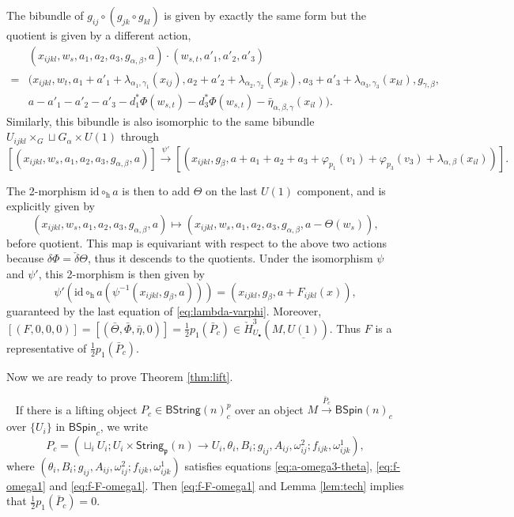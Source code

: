 \documentclass[letterpaper,10pt, oneside]{article} %
\newcommand{\bstringnp}{\mathsf{BString}(n)^p_{c}} %
\newcommand{\String}{\mathsf{String}}%
\newcommand{\BSpin}{\mathsf{BSpin}}%
\newcommand{\pf}{\noindent{\bf Proof.}\ }
\newcommand{\frkp}{\mathfrak p}
\def\qed{\hfill ~\vrule height6pt width6pt depth0pt}
\newcommand{\half}{\frac{1}{2}}
\newcommand{\pp}{\frkp} %
\newcommand{\h}{\mathrm{h}}
\newcommand{\id}{\mathrm{id}}
\newcommand{\bPhi}{\bar{\Phi}}
\newcommand{\bareta}{\bar{\eta}}
\newcommand{\bTheta}{\bar{\Theta}}
\begin{document}
The bibundle of $g_{ij} \circ (g_{jk}\circ
g_{kl})$ is given by exactly the same form but  the quotient is
given by a different action,
\[
\begin{split}
& (x_{ijkl}, w_s, a_1, a_2, a_3, g_{\alpha,\beta}, a) \cdot (w_{s, t},
a'_1, a'_2, a'_3)  \\
=& (x_{ijkl}, w_t, a_1+a'_1 + \lambda_{\alpha_1,\gamma_1}(x_{ij}),
a_2+a'_2+\lambda_{\alpha_2,\gamma_2}(x_{jk}),
a_3+a'_3+\lambda_{\alpha_3,\gamma_3}(x_{kl}), g_{\gamma,\beta}, \\
&a-a'_1-a'_2-a'_3-d_1^*\Phi(w_{s,t})-d^*_3\Phi(w_{s,t})-\bareta_{\alpha, \beta, \gamma}(x_{il})
).
\end{split}
\] Similarly,  this bibundle is also isomorphic to the same bibundle $U_{ijkl}\times_{G} \sqcup G_\alpha
\times U(1)$ through
\[
[(x_{ijkl}, w_s, a_1, a_2, a_3, g_{\alpha,\beta}, a)] \xrightarrow{\psi'}
[(x_{ijkl}, g_\beta,
a+a_1+a_2+a_3+\varphi_{p_1}(v_1)+\varphi_{p_3}(v_3)+\lambda_{\alpha,\beta}(x_{il}) )].
\]


The 2-morphism $\id\circ_\h a$ is then to add $\Theta$ on the last $U(1)$
component, and is
explicitly given by
\[
(x_{ijkl}, w_s, a_1, a_2, a_3, g_{\alpha,\beta}, a) \mapsto (x_{ijkl},
w_s, a_1, a_2, a_3, g_{\alpha,\beta}, a-\Theta(w_s) ),
\] before quotient. This map is
equivariant with respect to the above two actions because
$\delta\Phi=\check{\delta} \Theta$, thus it descends to
the quotients.  Under the isomorphism $\psi$ and $\psi'$, this
2-morphism is then given by
\[
\psi' (\id\circ_\h a (\psi^{-1}(x_{ijkl}, g_\beta, a)))=(x_{ijkl},
g_{\beta}, a+F_{ijkl}(x)),
\]
guaranteed by the last equation of \eqref{eq:lambda-varphi}. Moreover,
$[(F, 0, 0, 0)]=[ (\bTheta, \bPhi, \bareta, 0)] = \half p_1(\bar{P}_c)
\in \check{H}^3_{U_\bullet}(M, \underline{U(1)})$. Thus $F$ is a representative of $
\half p_1(\bar{P}_c)$.
\qed\vspace{3mm}

Now we are ready to prove Theorem \ref{thm:lift}.

\pf
If there is a lifting object $P_c \in \bstringnp$ over an object $M \xrightarrow{\bar{P}_c} \BSpin(n)_c$ over $\{ U_i\}$ in $\BSpin_c$, we write $$P_c =( \sqcup_i
U_{i}; U_i\times \String_\pp(n)\to U_i, \theta_i, B_i;
g_{ij}, A_{ij}, \omega^2_{ij}; f_{ijk}, \omega^1_{ijk}),$$ where $(\theta_i,B_i;
g_{ij}, A_{ij}, \omega^2_{ij}; f_{ijk}, \omega^1_{ijk})$ satisfies
equations \eqref{eq:a-omega3-theta}, \eqref{eq:f-omega1} and
\eqref{eq:f-F-omega1}. Then \eqref{eq:f-F-omega1} and Lemma
\ref{lem:tech} implies that $\half p_1(\bar{P}_c)=0$.
\end{document}
